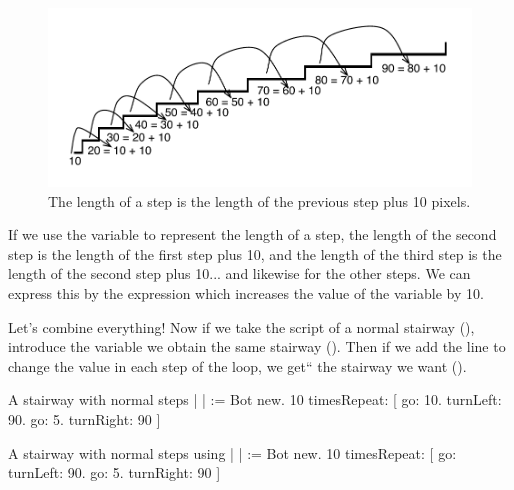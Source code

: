 \begin{figure}[h]
\begin{center}
\includegraphics{stairExplained}
\end{center}
\caption{The length of a step is the length of the previous step plus 10 pixels.}\label{fig:stairExplained}
\end{figure}

If we use the variable  to represent the length of a step, the length of the second step is the length of the first step plus 10, and the length of the third step is the length of the second step plus 10... and likewise for the other steps. We can express this by the expression  which increases the value of the variable  by 10.

Let's combine everything! Now if we take the script of a normal stairway (), introduce the variable  we obtain the same stairway
().  Then if we add the line  to change the  value in each step of the loop, we get`` the stairway we want ().

\begin{scriptwithtitle}{A stairway with normal steps}\label{src:normalstair}
| \caro |
\caro := Bot new.
10 timesRepeat: 
               [ \caro go: 10.
               \caro turnLeft: 90.
               \caro go: 5.
               \caro turnRight: 90 ]
\end{scriptwithtitle}

\begin{scriptwithtitle}{A stairway with normal steps using }\label{src:normalstairlength}
| \caro {}|
\caro := Bot new.
10 timesRepeat: 
               [ \caro go: 
               \caro turnLeft: 90.
               \caro go: 5.
               \caro turnRight: 90 ]
\end{scriptwithtitle}

